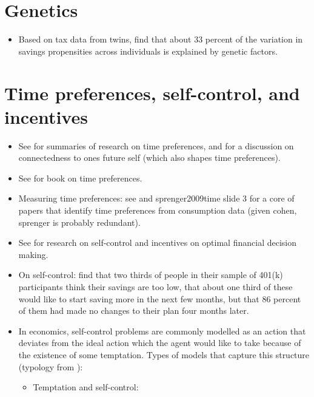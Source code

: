 \documentclass[a4paper, 11pt]{report}
\begin{document}
\section{Genetics}%
\label{sec:genetics}

\begin{itemize}
    \item Based on tax data from twins, \citet{cronqvist2015origins} find that
        about 33 percent of the variation in savings propensities across
        individuals is explained by genetic factors.
\end{itemize}

\section{Time preferences, self-control, and incentives}
\begin{itemize}
	\item See \citet{agarwal2017shapes, greenberg2019financial} for summaries of research on time preferences, and \citet{greenberg2019financial} for a discussion on connectedness to ones future self (which also shapes time preferences).

	\item See \citet{loewenstein2003time} for book on time preferences.

	\item Measuring time preferences: see \citet{cohen2016measuring} and sprenger2009time slide 3 for a core of papers that identify time preferences from consumption data (given cohen, sprenger is probably redundant).

	\item See \citet{agarwal2017shapes} for research on self-control and incentives on optimal financial decision making.

	\item On self-control: \citet{choi2004better} find that two thirds of people in their sample of 401(k) participants think their savings are too low, that about one third of these would like to start saving more in the next few months, but that 86 percent of them had made no changes to their plan four months later.

	\item In economics, self-control problems are commonly modelled as an action that deviates from the ideal action which the agent would like to take because of the existence of some temptation. Types of models that capture this structure (typology from \citet{ameriks2007measuring}):
	\begin{itemize}
		\item Temptation and self-control: \citet{gul2001temptation}


\end{itemize}
\end{itemize}
\end{document}
